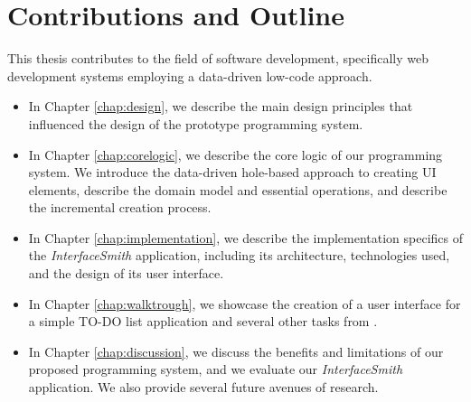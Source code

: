 \section* {Contributions and Outline}
This thesis contributes to the field of software development, specifically web development systems employing a data-driven low-code approach.
\begin{itemize}
	\item In Chapter \ref{chap:design}, we describe the main design principles that influenced the design of the
	      prototype programming system.
	\item {In Chapter \ref{chap:corelogic}, we describe the core logic of our programming system.
	      We introduce the data-driven hole-based approach to creating UI elements, describe the domain model and essential operations,
	      and describe the incremental creation process.}
	\item In Chapter \ref{chap:implementation}, we describe the implementation specifics of the \emph{InterfaceSmith} application, including its architecture, technologies used, and the design of its user interface.
	\item In Chapter \ref{chap:walktrough}, we showcase the creation of a user interface for a simple TO-DO list application and several other tasks from \citet{7GUIs-web}.
	\item In Chapter \ref{chap:discussion}, we discuss the benefits and limitations of our proposed programming system, and we evaluate our \emph{InterfaceSmith} application.
	      We also provide several future avenues of research.
\end{itemize}
